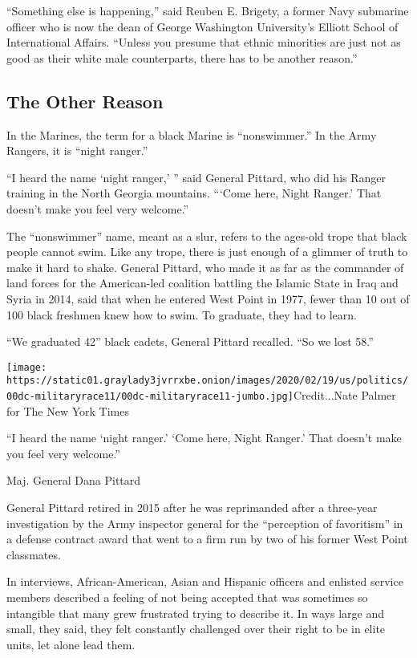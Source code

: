 ``Something else is happening,'' said Reuben E. Brigety, a former Navy
submarine officer who is now the dean of George Washington University's
Elliott School of International Affairs. ``Unless you presume that
ethnic minorities are just not as good as their white male counterparts,
there has to be another reason.''

\hypertarget{the-other-reason}{%
\subsection{The Other Reason}\label{the-other-reason}}

In the Marines, the term for a black Marine is ``nonswimmer.'' In the
Army Rangers, it is ``night ranger.''

``I heard the name `night ranger,' '' said General Pittard, who did his
Ranger training in the North Georgia mountains. ```Come here, Night
Ranger.' That doesn't make you feel very welcome.''

The ``nonswimmer'' name, meant as a slur, refers to the ages-old trope
that black people cannot swim. Like any trope, there is just enough of a
glimmer of truth to make it hard to shake. General Pittard, who made it
as far as the commander of land forces for the American-led coalition
battling the Islamic State in Iraq and Syria in 2014, said that when he
entered West Point in 1977, fewer than 10 out of 100 black freshmen knew
how to swim. To graduate, they had to learn.

``We graduated 42'' black cadets, General Pittard recalled. ``So we lost
58.''

\texttt{[image: https://static01.graylady3jvrrxbe.onion/images/2020/02/19/us/politics/00dc-militaryrace11/00dc-militaryrace11-jumbo.jpg]}Credit...Nate
Palmer for The New York Times

``I heard the name `night ranger.' `Come here, Night Ranger.' That
doesn't make you feel very welcome.''

Maj. General Dana Pittard

General Pittard retired in 2015 after he was reprimanded after a
three-year investigation by the Army inspector general for the
``perception of favoritism'' in a defense contract award that went to a
firm run by two of his former West Point classmates.

In interviews, African-American, Asian and Hispanic officers and
enlisted service members described a feeling of not being accepted that
was sometimes so intangible that many grew frustrated trying to describe
it. In ways large and small, they said, they felt constantly challenged
over their right to be in elite units, let alone lead them.


